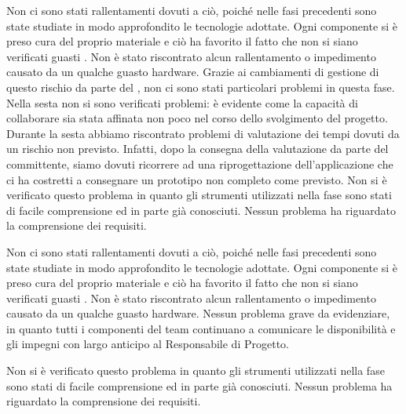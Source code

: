 		Non ci sono stati rallentamenti dovuti a ciò, poiché nelle fasi precedenti sono state studiate in modo approfondito le tecnologie adottate.
		Ogni componente si è preso cura del proprio materiale e ciò ha favorito il fatto che non si siano verificati guasti . Non è stato riscontrato alcun rallentamento o impedimento causato da un qualche guasto hardware.
		Grazie ai cambiamenti di gestione di questo rischio da parte del , non ci sono stati particolari problemi in questa fase.
		Nella sesta  non si sono verificati problemi: è evidente come la capacità di collaborare sia stata affinata non poco nel corso dello svolgimento del progetto.
		Durante la sesta  abbiamo riscontrato problemi di valutazione dei tempi dovuti da un rischio non previsto. Infatti, dopo la consegna della valutazione da parte del committente, siamo dovuti ricorrere ad una riprogettazione dell'applicazione  che ci ha costretti a consegnare un prototipo non completo come previsto.
		Non si è verificato questo problema in quanto gli strumenti utilizzati nella fase sono stati di facile comprensione ed in parte già conosciuti.
		Nessun problema ha riguardato la comprensione dei requisiti.

		Non ci sono stati rallentamenti dovuti a ciò, poiché nelle fasi precedenti sono state studiate in modo approfondito le tecnologie adottate.
		Ogni componente si è preso cura del proprio materiale e ciò ha favorito il fatto che non si siano verificati guasti . Non è stato riscontrato alcun rallentamento o impedimento causato da un qualche guasto hardware.
		Nessun problema grave da evidenziare, in quanto tutti i componenti del team continuano a comunicare le disponibilità e gli impegni con largo anticipo al Responsabile di Progetto.
		
		
		Non si è verificato questo problema in quanto gli strumenti utilizzati nella fase sono stati di facile comprensione ed in parte già conosciuti.
		Nessun problema ha riguardato la comprensione dei requisiti.
